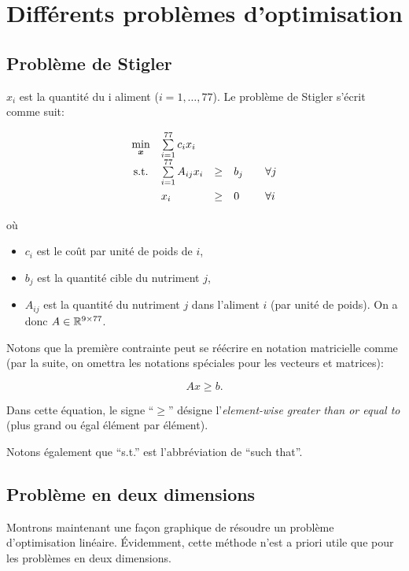 \section{Différents problèmes d'optimisation}

\subsection{Problème de Stigler}

	$x_i$ est la quantité du i\ieme{} aliment ($i = 1,\dots,77$).
	Le problème de Stigler s'écrit comme suit:

	\begin{equation*}
	\renewcommand{\arraystretch}{1.5}
	\begin{array}{c@{\quad} l c l@{\qquad} l}
		\min\limits_{\bm{x}} & \sum\limits_{i = 1}^{77} c_i x_i & & & \\
		\textnormal{s.t.} & \sum\limits_{i = 1}^{77} A_{ij} x_i & \ge & b_j & \forall j\\
		& x_i & \ge & 0 & \forall i
	\end{array}
	\end{equation*}

	où

	\begin{itemize}
		\item $c_i$ est le coût par unité de poids de $i$,
		\item $b_j$ est la quantité cible du nutriment $j$,
		\item $A_{ij}$ est la quantité du nutriment $j$
		dans l'aliment $i$ (par unité de poids).
		On a donc $A \in \mathbb{R}^{9 \times 77}$.
	\end{itemize}

	Notons que la première contrainte
	peut se réécrire en notation matricielle comme
	(par la suite,
	on omettra les notations spéciales pour les vecteurs et matrices):

	\[
	Ax \ge b.
	\]

	Dans cette équation,
	le signe ``$\ge$'' désigne
	l'\emph{element-wise greater than or equal to}
	(plus grand ou égal élément par élément).

	Notons également que ``s.t.'' est l'abbréviation de ``such that''.

\subsection{Problème en deux dimensions}

	Montrons maintenant une façon graphique
	de résoudre un problème d'optimisation linéaire.
	Évidemment, cette méthode n'est a priori utile
	que pour les problèmes en deux dimensions.

